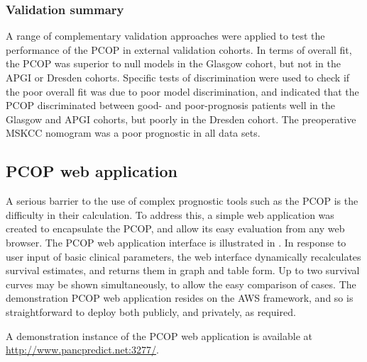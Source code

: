 \documentclass[dissertation.tex]{subfiles}
\begin{document}
\subsubsection{Validation summary}
A range of complementary validation approaches were applied to test the performance of the \gls{PCOP} in external validation cohorts.  In terms of overall fit, the \gls{PCOP} was superior to null models in the Glasgow cohort, but not in the \gls{APGI} or Dresden cohorts.  Specific tests of discrimination were used to check if the poor overall fit was due to poor model discrimination, and indicated that the \gls{PCOP} discriminated between good- and poor-prognosis patients well in the Glasgow and \gls{APGI} cohorts, but poorly in the Dresden cohort.  The preoperative \gls{MSKCC} nomogram was a poor prognostic in all data sets.

\subsection{PCOP web application}
A serious barrier to the use of complex prognostic tools such as the \gls{PCOP} is the difficulty in their calculation.  To address this, a simple web application was created to encapsulate the \gls{PCOP}, and allow its easy evaluation from any web browser.  The \gls{PCOP} web application interface is illustrated in .  In response to user input of basic clinical parameters, the web interface dynamically recalculates survival estimates, and returns them in graph and table form.  Up to two survival curves may be shown simultaneously, to allow the easy comparison of cases.  The demonstration \gls{PCOP} web application resides on the \gls{AWS} framework, and so is straightforward to deploy both publicly, and privately, as required.

A demonstration instance of the \gls{PCOP} web application is available at \url{http://www.pancpredict.net:3277/}.
\end{document}
